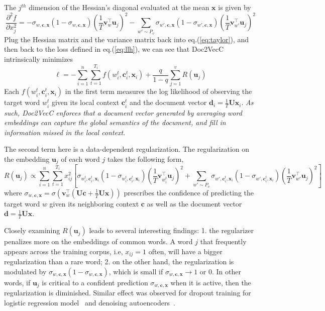 \documentclass{article} \usepackage{iclr2017_conference,times}
\newcommand{\name}{Doc2VecC}
\newcommand{\ul}{\mathbf{u}}
\newcommand{\vl}{\mathbf{v}}
\newcommand{\cl}{\mathbf{c}}
\newcommand{\dl}{\mathbf{d}}
\newcommand{\xl}{\mathbf{x}}
\newcommand{\uul}{\mathbf{U}}
\begin{document}
The $j^{th}$ dimension of the Hessian's diagonal evaluated at the mean $\xl$ is given by 
$$\frac{\partial^2 f}{\partial x_j^2} = - \sigma_{w, \cl, \xl} (1 - \sigma_{w, \cl, \xl} )(\frac{1}{T}\vl_{w}^\top\ul_j)^2 - \sum_{w'\sim P_v}\sigma_{w', \cl, \xl} (1 - \sigma_{w', \cl, \xl} )(\frac{1}{T}\vl_{w'}^\top\ul_j)^2$$
Plug the Hessian matrix and the variance matrix back into eq.(\ref{eq:taylor}), and then back to the loss defined in eq.(\ref{eq:llh}), we can see that \name{} intrinsically minimizes
\begin{equation}
\ell = -\sum_{i=1}^n\sum_{t=1}^{T_i} f(w_i^t, \cl_i^t, \xl_i) + \frac{q}{1-q} \sum_{j=1}^v R(\ul_j)
\end{equation}
Each $f(w_i^t, \cl_i^t, \xl_i)$ in the first term measures the log likelihood of observing the target word $w_i^t$ given its local context $\cl_i^t$ and the document vector $\dl_i = \frac{1}{T}\uul\xl_i$. \textit{As such, \name{} enforces that a document vector generated by averaging word embeddings can capture the global semantics of the document, and fill in information missed in the local context.} 

The second term here is a data-dependent regularization. The regularization on the embedding $\ul_j$ of each word $j$ takes the following form,
$$R(\ul_j) \propto  \sum_{i=1}^n\sum_{t=1}^{T_i} x_{ij}^2\left[\sigma_{w_i^t, \cl_i^t, \xl_i} (1 - \sigma_{w_i^t, \cl_i^t, \xl_i})(\frac{1}{T}\vl_{w_i^t}^\top\ul_j)^2 + \sum_{w'\sim P_{v}}\sigma_{w', \cl_i^t, \xl_i} (1 - \sigma_{w', \cl_i^t, \xl_i} )(\frac{1}{T}\vl_{w'}^\top\ul_j)^2\right] $$
where $\sigma_{w, \cl, \xl} = \sigma(\vl_w^\top(\uul \cl + \frac{1}{T}\uul \xl))$ prescribes the confidence of predicting the target word $w$ given its neighboring context $\cl$ as well as the document vector $\dl = \frac{1}{T}\uul\xl$. 

Closely examining $R(\ul_j)$ leads to several interesting findings: 1. the regularizer penalizes more on the embeddings of common words. A word $j$ that frequently appears across the training corpus, i.e, $x_{ij} = 1$ often, will have a bigger regularization than a rare word; 2. on the other hand, the regularization is modulated by $\sigma_{w, \cl, \xl} (1 - \sigma_{w, \cl, \xl})$, which is small if $\sigma_{w, \cl, \xl} \rightarrow 1 \mbox{ or } 0$.  In other words, if $\ul_j$ is critical to a confident prediction $\sigma_{w, \cl, \xl}$ when it is active, then the regularization is diminished. Similar effect was observed for dropout training for logistic regression model~\citep{wager2013dropout} and denoising autoencoders~\citep{chen2014marginalized}. 
\end{document}
